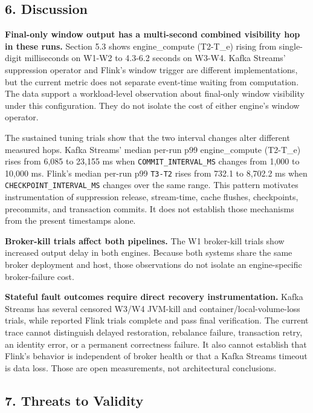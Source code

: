 \documentclass[
]{article}
\begin{document}
\hypertarget{discussion}{%
\subsection{6. Discussion}\label{discussion}}

\textbf{Final-only window output has a multi-second combined visibility
hop in these runs.} Section 5.3 shows engine_compute (T2-T_e) rising from
single-digit milliseconds on W1-W2 to 4.3-6.2 seconds on W3-W4. Kafka
Streams' suppression operator and Flink's window trigger are different
implementations, but the current metric does not separate event-time
waiting from computation. The data support a workload-level observation
about final-only window visibility under this configuration. They do not
isolate the cost of either engine's window operator.

The sustained tuning trials show that the two interval changes alter
different measured hops. Kafka Streams' median per-run p99
engine_compute (T2-T_e) rises from 6,085 to 23,155 ms when
\texttt{COMMIT\_INTERVAL\_MS} changes from 1,000 to 10,000 ms. Flink's
median per-run p99 \texttt{T3-T2} rises from 732.1 to 8,702.2 ms when
\texttt{CHECKPOINT\_INTERVAL\_MS} changes over the same range. This
pattern motivates instrumentation of suppression release, stream-time,
cache flushes, checkpoints, precommits, and transaction commits. It does
not establish those mechanisms from the present timestamps alone.

\textbf{Broker-kill trials affect both pipelines.} The W1 broker-kill
trials show increased output delay in both engines. Because both systems
share the same broker deployment and host, those observations do not
isolate an engine-specific broker-failure cost.

\textbf{Stateful fault outcomes require direct recovery
instrumentation.} Kafka Streams has several censored W3/W4 JVM-kill and
container/local-volume-loss trials, while reported Flink trials complete
and pass final verification. The current trace cannot distinguish
delayed restoration, rebalance failure, transaction retry, an identity
error, or a permanent correctness failure. It also cannot establish that
Flink's behavior is independent of broker health or that a Kafka Streams
timeout is data loss. Those are open measurements, not architectural
conclusions.

\hypertarget{threats-to-validity}{%
\subsection{7. Threats to Validity}\label{threats-to-validity}}
\end{document}
